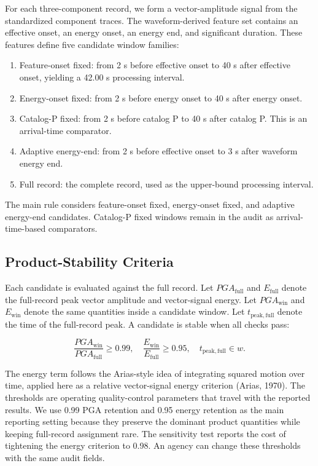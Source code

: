 \documentclass[12pt,letterpaper]{article}
\providecommand{\tightlist}{\setlength{\itemsep}{0pt}\setlength{\parskip}{0pt}}
\begin{document}
For each three-component record, we form a vector-amplitude signal from the standardized component traces. The waveform-derived feature set contains an effective onset, an energy onset, an energy end, and significant duration. These features define five candidate window families:

\begin{enumerate}
\def\labelenumi{\arabic{enumi}.}
\tightlist
\item
  Feature-onset fixed: from 2 s before effective onset to 40 s after effective onset, yielding a 42.00 s processing interval.
\item
  Energy-onset fixed: from 2 s before energy onset to 40 s after energy onset.
\item
  Catalog-P fixed: from 2 s before catalog P to 40 s after catalog P. This is an arrival-time comparator.
\item
  Adaptive energy-end: from 2 s before effective onset to 3 s after waveform energy end.
\item
  Full record: the complete record, used as the upper-bound processing interval.
\end{enumerate}

The main rule considers feature-onset fixed, energy-onset fixed, and adaptive energy-end candidates. Catalog-P fixed windows remain in the audit as arrival-time-based comparators.

\subsection{Product-Stability Criteria}\label{product-stability-criteria}

Each candidate is evaluated against the full record. Let \(PGA_{\mathrm{full}}\) and \(E_{\mathrm{full}}\) denote the full-record peak vector amplitude and vector-signal energy. Let \(PGA_{\mathrm{win}}\) and \(E_{\mathrm{win}}\) denote the same quantities inside a candidate window. Let \(t_{\mathrm{peak,full}}\) denote the time of the full-record peak. A candidate is stable when all checks pass:

\[
\frac{PGA_{\mathrm{win}}}{PGA_{\mathrm{full}}} \geq 0.99,
\quad
\frac{E_{\mathrm{win}}}{E_{\mathrm{full}}} \geq 0.95,
\quad
t_{\mathrm{peak,full}} \in w .
\]

The energy term follows the Arias-style idea of integrating squared motion over time, applied here as a relative vector-signal energy criterion (Arias, 1970). The thresholds are operating quality-control parameters that travel with the reported results. We use 0.99 PGA retention and 0.95 energy retention as the main reporting setting because they preserve the dominant product quantities while keeping full-record assignment rare. The sensitivity test reports the cost of tightening the energy criterion to 0.98. An agency can change these thresholds with the same audit fields.
\end{document}
